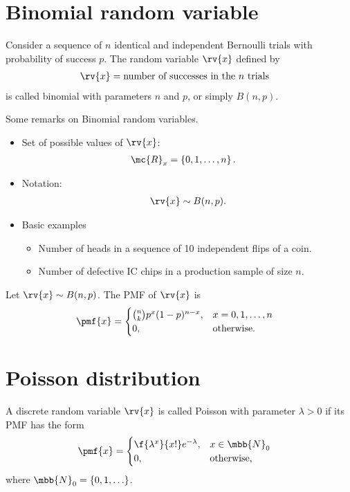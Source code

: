 \section{Binomial random variable}
\begin{mydefinition}
    Consider a sequence of $n$ identical and independent Bernoulli trials with probability of success $p$. The random variable $\rv{x}$ defined by
    \begin{align}
        \rv{x} &= \text{number of successes in the $n$ trials}
    \end{align}
    is called binomial with parameters $n$ and $p$, or simply $B(n,p)$.
\end{mydefinition}
\begin{myremark}
    Some remarks on Binomial random variables.
    \begin{itemize}
        \item Set of possible values of $\rv{x}$:
        \begin{align}
            \mc{R}_{x} &= \left\{ 0, 1, \ldots, n\right\}.
        \end{align}
        \item Notation:
        \begin{align}
            \rv{x} \sim B(n, p).
        \end{align}
        \item Basic examples
        \begin{itemize}
            \item Number of heads in a sequence of 10 independent flips of a coin.
            \item Number of defective IC chips in a production sample of size $n$.
        \end{itemize}
    \end{itemize}
\end{myremark}
\begin{mytheorem}
   Let $\rv{x}\sim B(n,p)$. The PMF of $\rv{x}$ is
   \begin{align}
       \pmf{x} &= 
       \begin{cases}
           \binom{n}{k} p^{x}(1-p)^{n-x}, &x = 0, 1, \ldots, n\\
           0, &\text{otherwise}.
       \end{cases}
   \end{align}
\end{mytheorem}


\section{Poisson distribution}
A discrete random variable $\rv{x}$ is called Poisson with parameter $\lambda > 0$ if its PMF has the form
\begin{align}
    \pmf{x} &= 
    \begin{cases}
        \f{\lambda^{x}}{x!}e^{-\lambda}, &x\in\mbb{N}_{0}\\
        0, &\text{otherwise},
    \end{cases}
\end{align}
where $\mbb{N}_{0} = \left\{ 0, 1, \ldots\right\}$.

